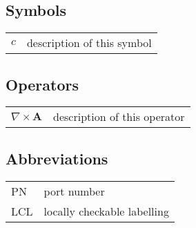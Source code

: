 
\subsection*{Symbols}

\begin{tabular}{ll}
$c$              & description of this symbol\\
\end{tabular}

\subsection*{Operators}

\begin{tabular}{ll}
$\nabla \times \mathbf{A}$              & description of this operator\\
\end{tabular}

\subsection*{Abbreviations}

\begin{tabular}{ll}
PN              & port number\\
LCL             & locally checkable labelling\\
\end{tabular}
